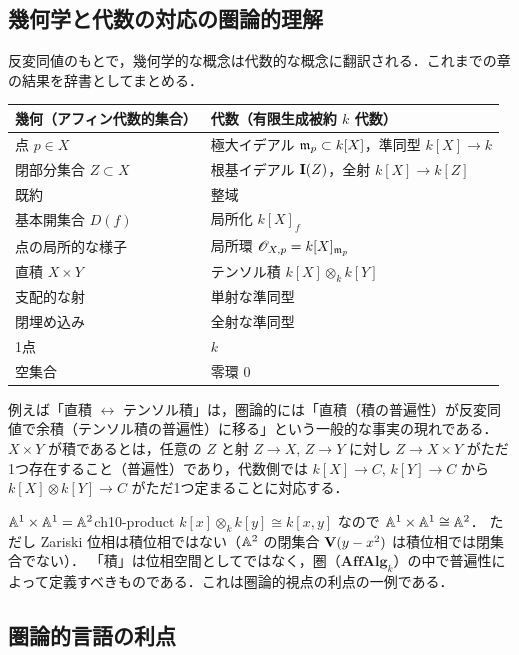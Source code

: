 \subsection{幾何学と代数の対応の圏論的理解}

反変同値のもとで，幾何学的な概念は代数的な概念に翻訳される．これまでの章の結果を辞書としてまとめる．

\begin{center}
\renewcommand{\arraystretch}{1.35}
\begin{tabular}{ll}
\hline
幾何（アフィン代数的集合） & 代数（有限生成被約 $k$ 代数） \\
\hline
点 $p\in X$ & 極大イデアル $\mathfrak{m}_p\subset k[X]$，準同型 $k[X]\to k$ \\
閉部分集合 $Z\subset X$ & 根基イデアル $\mathbf{I}(Z)$，全射 $k[X]\to k[Z]$ \\
既約 & 整域 \\
基本開集合 $D(f)$ & 局所化 $k[X]_f$ \\
点の局所的な様子 & 局所環 $\mathscr{O}_{X,p}=k[X]_{\mathfrak{m}_p}$ \\
直積 $X\times Y$ & テンソル積 $k[X]\otimes_kk[Y]$ \\
支配的な射 & 単射な準同型 \\
閉埋め込み & 全射な準同型 \\
1点 & $k$ \\
空集合 & 零環 $0$ \\
\hline
\end{tabular}
\end{center}

例えば「直積 $\leftrightarrow$ テンソル積」は，圏論的には「直積（積の普遍性）が反変同値で余積（テンソル積の普遍性）に移る」という一般的な事実の現れである．
$X\times Y$ が積であるとは，任意の $Z$ と射 $Z\to X$, $Z\to Y$ に対し $Z\to X\times Y$ がただ1つ存在すること（普遍性）であり，代数側では $k[X]\to C$, $k[Y]\to C$ から $k[X]\otimes k[Y]\to C$ がただ1つ定まることに対応する．

\begin{myex}{$\mathbb{A}^1\times\mathbb{A}^1=\mathbb{A}^2$}{ch10-product}
$k[x]\otimes_kk[y]\cong k[x,y]$ なので $\mathbb{A}^1\times\mathbb{A}^1\cong\mathbb{A}^2$．
ただし Zariski 位相は積位相ではない（$\mathbb{A}^2$ の閉集合 $\mathbf{V}(y-x^2)$ は積位相では閉集合でない）．
「積」は位相空間としてではなく，圏（$\mathbf{AffAlg}_k$）の中で普遍性によって定義すべきものである．これは圏論的視点の利点の一例である．
\end{myex}

\subsection{圏論的言語の利点}

